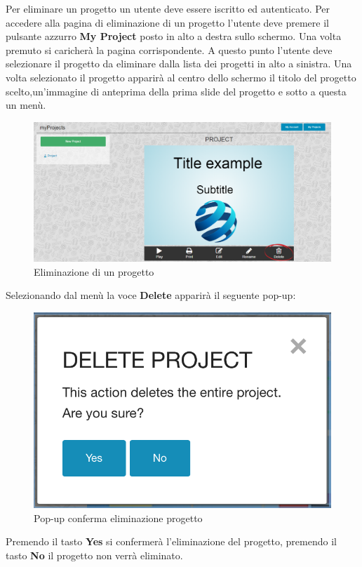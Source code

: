 Per eliminare un progetto un utente deve essere iscritto ed autenticato. Per accedere alla pagina di eliminazione di un progetto l'utente deve premere il pulsante azzurro \textbf{My Project} posto in alto a destra sullo schermo. Una volta premuto si caricherà la pagina corrispondente. A questo punto l'utente deve selezionare il progetto da eliminare dalla lista dei progetti in alto a sinistra.
Una volta selezionato il progetto apparirà al centro dello schermo il titolo del progetto scelto,un'immagine di anteprima della prima slide del progetto e sotto a questa un menù. 

\begin{figure}[H] 
	\centering 
	\includegraphics[scale=0.40] {img/elimina_pro.png}
	\caption{Eliminazione di un progetto} 
\end{figure}

Selezionando dal menù la voce \textbf{Delete} apparirà il seguente pop-up:

\begin{figure}[H] 
	\centering 
	\includegraphics[scale=0.60] {img/del_project.png}
	\caption{Pop-up conferma eliminazione progetto} 
\end{figure}

\noindent Premendo il tasto \textbf{Yes} si confermerà l'eliminazione del progetto, premendo il tasto \textbf{No} il progetto non verrà eliminato.